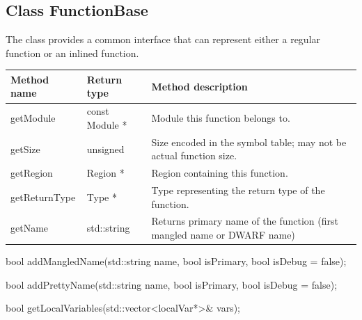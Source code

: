 \subsection{Class FunctionBase}\label{FunctionBase}


The  class provides a common interface that can represent either a regular function or an inlined function.

\begin{tabularx}{\textwidth}{llX}
\toprule
Method name & Return type & Method description \\
\midrule
getModule & const Module * & Module this function belongs to. \\
getSize & unsigned & Size encoded in the symbol table; may not be actual function size. \\
getRegion & Region * & Region containing this function. \\
getReturnType & Type * & Type representing the return type of the function. \\
getName & std::string & Returns primary name of the function (first mangled name or DWARF name) \\
\bottomrule
\end{tabularx}


\begin{apient}
bool addMangledName(std::string name,
                    bool isPrimary,
                    bool isDebug = false);
\end{apient}

\begin{apient}
bool addPrettyName(std::string name,
                   bool isPrimary,
                   bool isDebug = false);
\end{apient}

\begin{apient}
bool getLocalVariables(std::vector<localVar*>& vars);
\end{apient}

